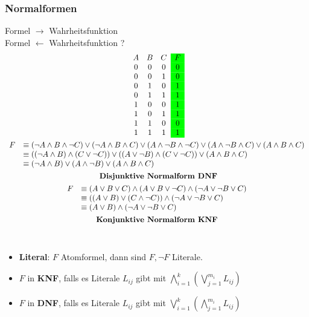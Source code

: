 \subsubsection{Normalformen}
Formel $\rightarrow$ Wahrheitsfunktion \\
Formel $\leftarrow$ Wahrheitsfunktion ? \\
\begin{gather*}
	\begin{array}{ c c c >{\columncolor{green}}c }
		A 	& B	& C	& F	\\
		0	& 0	& 0	& 0	\\
		0	& 0	& 1	& 0	\\
		0	& 1	& 0	& 1	\\
		0	& 1	& 1	& 1	\\
		1	& 0	& 0	& 1	\\
		1	& 0	& 1	& 1	\\
		1	& 1	& 0	& 0	\\
		1	& 1	& 1	& 1	\\
	\end{array}\\
	\begin{array}{ l l }
	F 	& \equiv ( \neg A \wedge B \wedge \neg C ) \vee ( \neg A \wedge B \wedge C ) \vee ( A \wedge \neg B \wedge \neg C ) \vee ( A \wedge  \neg B \wedge C ) \vee ( A \wedge B \wedge C ) \\
		& \equiv ( ( \neg A \wedge B ) \wedge ( C \vee \neg C ) ) \vee ( ( A \vee \neg B ) \wedge ( C \vee \neg C ) ) \vee ( A \wedge B \wedge C ) \\
		& \equiv ( \neg A \wedge B ) \vee ( A \wedge \neg B ) \vee ( A \wedge B \wedge C )
	\end{array}\\
	\textbf{ Disjunktive Normalform DNF}\\
	\begin{array}{ l l }
		F	& \equiv ( A \vee B \vee C ) \wedge ( A \vee B \vee \neg C ) \wedge ( \neg A \vee \neg B \vee C )	\\
			& \equiv ( ( A \vee B ) \vee ( C \wedge \neg C ) ) \wedge ( \neg A \vee \neg B \vee C )			\\
			& \equiv ( A \vee B ) \wedge ( \neg A \vee \neg B \vee C )							
	\end{array}\\
	\textbf{Konjunktive Normalform KNF}
\end{gather*}\\
\begin{def*}[note = {DNF, KNF} , index = Normalform]
	\begin{itemize}
		\item \textbf{Literal}: $F$ Atomformel, dann sind $F, \neg F$ Literale.
		\item $F$ in \textbf{KNF}, falls es Literale $L_{ij}$ gibt mit $\bigwedge_{i=1}^k ( \bigvee_{j=1}^{m_i} L_{ij} )$
		\item $F$ in \textbf{DNF}, falls es Literale $L_{ij}$ gibt mit $\bigvee_{i=1}^k ( \bigwedge_{j=1}^{m_i} L_{ij} )$
	\end{itemize}
\end{def*}

